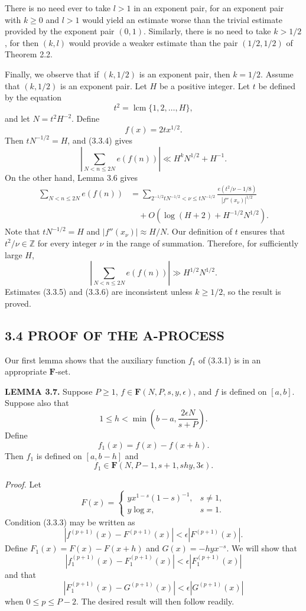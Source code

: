 \documentclass[10pt]{article}
\newcommand{\Fclass}{\mathbf{F}}
\newcommand{\lcmop}{\operatorname{lcm}}
\begin{document}
There is no need ever to take $l>1$ in an exponent pair, for an exponent pair
with $k\geq0$ and $l>1$ would yield an estimate worse than the trivial
estimate provided by the exponent pair $(0,1)$. Similarly, there is no need
to take $k>1/2$, for then $(k,l)$ would provide a weaker estimate than the
pair $(1/2,1/2)$ of Theorem 2.2.

Finally, we observe that if $(k,1/2)$ is an exponent pair, then $k=1/2$.
Assume that $(k,1/2)$ is an exponent pair. Let $H$ be a positive integer. Let
$t$ be defined by the equation
\[
 t^2=\lcmop\{1,2,\ldots,H\},
\]
and let $N=t^2H^{-2}$. Define
\[
 f(x)=2t x^{1/2}.
\]
Then $tN^{-1/2}=H$, and (3.3.4) gives
\begin{equation*}
 \left|\sum_{N<n\leq2N}e(f(n))\right|
 \ll H^kN^{1/2}+H^{-1}. \tag{3.3.5}
\end{equation*}
On the other hand, Lemma 3.6 gives
\[
\begin{aligned}
 \sum_{N<n\leq2N}e(f(n))
 &=\sum_{2^{-1/2}tN^{-1/2}<\nu\leq tN^{-1/2}}
  \frac{e(t^2/\nu-1/8)}{|f''(x_\nu)|^{1/2}}\\
 &\quad+O\left(\log(H+2)+H^{-1/2}N^{1/2}\right).
\end{aligned}
\]
Note that $tN^{-1/2}=H$ and $|f''(x_\nu)|\approx H/N$. Our definition of
$t$ ensures that $t^2/\nu\in\mathbb Z$ for every integer $\nu$ in the range
of summation. Therefore, for sufficiently large $H$,
\begin{equation*}
 \left|\sum_{N<n\leq2N}e(f(n))\right|
 \gg H^{1/2}N^{1/2}. \tag{3.3.6}
\end{equation*}
Estimates (3.3.5) and (3.3.6) are inconsistent unless $k\geq1/2$, so the
result is proved.

\subsection*{3.4 PROOF OF THE A-PROCESS}

Our first lemma shows that the auxiliary function $f_1$ of (3.3.1) is in an
appropriate $\Fclass$-set.

\medskip
\noindent\textbf{LEMMA 3.7.}
Suppose $P\geq1$, $f\in\Fclass(N,P,s,y,\epsilon)$, and $f$ is defined on
$[a,b]$. Suppose also that
\[
 1\leq h<\min\left(b-a,\frac{2\epsilon N}{s+P}\right).
\]
Define
\[
 f_1(x)=f(x)-f(x+h).
\]
Then $f_1$ is defined on $[a,b-h]$ and
\[
 f_1\in\Fclass(N,P-1,s+1,shy,3\epsilon).
\]

\noindent\textit{Proof.}
Let
\[
 F(x)=
 \begin{cases}
  yx^{1-s}(1-s)^{-1},&s\neq1,\\
  y\log x,&s=1.
 \end{cases}
\]
Condition (3.3.3) may be written as
\[
 |f^{(p+1)}(x)-F^{(p+1)}(x)|
 <\epsilon|F^{(p+1)}(x)|.
\]
Define $F_1(x)=F(x)-F(x+h)$ and $G(x)=-hyx^{-s}$. We will show that
\begin{equation*}
 |f_1^{(p+1)}(x)-F_1^{(p+1)}(x)|
 <\epsilon|F_1^{(p+1)}(x)| \tag{3.4.1}
\end{equation*}
and that
\begin{equation*}
 |F_1^{(p+1)}(x)-G^{(p+1)}(x)|
 <\epsilon|G^{(p+1)}(x)| \tag{3.4.2}
\end{equation*}
when $0\leq p\leq P-2$. The desired result will then follow readily.
\end{document}

